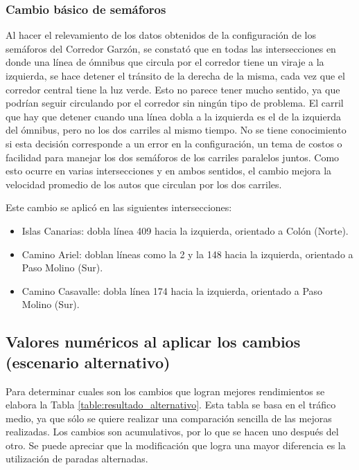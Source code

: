 \subsubsection{Cambio básico de semáforos}
Al hacer el relevamiento de los datos obtenidos de la configuración de los semáforos del Corredor Garzón, se constató que en todas las intersecciones en donde una línea de ómnibus que circula por el corredor tiene un viraje a la izquierda, se hace detener el tránsito de la derecha de la misma, cada vez que el corredor central tiene la luz verde. Esto no parece tener mucho sentido, ya que podrían seguir circulando por el corredor sin ningún tipo de problema. El carril que hay que detener cuando una línea dobla a la izquierda es el de la izquierda del ómnibus, pero no los dos carriles al mismo tiempo. No se tiene conocimiento si esta decisión corresponde a un error en la configuración, un tema de costos o facilidad para manejar los dos semáforos de los carriles paralelos juntos. Como esto ocurre en varias intersecciones y en ambos sentidos, el cambio mejora la velocidad promedio de los autos que circulan por los dos carriles.

Este cambio se aplicó en las siguientes intersecciones:
\begin{itemize}
	\item Islas Canarias: dobla línea 409 hacia la izquierda, orientado a Colón (Norte).
	\item Camino Ariel: doblan líneas como la  2 y la 148 hacia la izquierda, orientado a Paso Molino (Sur). 
	\item Camino Casavalle: dobla línea 174 hacia la izquierda, orientado a Paso Molino (Sur). 
\end{itemize}

\subsection{Valores numéricos al aplicar los cambios (escenario alternativo)}

Para determinar cuales son los cambios que logran mejores rendimientos se elabora la Tabla \ref{table:resultado_alternativo}. Esta tabla se basa en el tráfico medio, ya que sólo se quiere realizar una comparación sencilla de las mejoras realizadas. Los cambios son acumulativos, por lo que se hacen uno después del otro. Se puede apreciar que la modificación que logra una mayor diferencia es la utilización de paradas alternadas.


